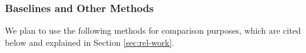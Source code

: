 \documentclass[11pt,a4paper]{article}
\begin{document}
        

\subsubsection{Baselines and Other Methods}
\label{sssec:baselines}
We plan to use the following methods for comparison purposes, which are cited below and explained in Section \ref{sec:rel-work}.
\end{document}
